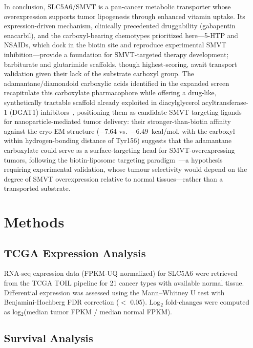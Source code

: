 \documentclass[10pt,letterpaper]{article}
\begin{document}
In conclusion, SLC5A6/SMVT is a pan-cancer metabolic transporter whose overexpression supports tumor lipogenesis through enhanced vitamin uptake. Its expression-driven mechanism, clinically precedented druggability (gabapentin enacarbil), and the carboxyl-bearing chemotypes prioritized here---5-HTP and NSAIDs, which dock in the biotin site and reproduce experimental SMVT inhibition---provide a foundation for SMVT-targeted therapy development; barbiturate and glutarimide scaffolds, though highest-scoring, await transport validation given their lack of the substrate carboxyl group. The adamantane/diamondoid carboxylic acids identified in the expanded screen recapitulate this carboxylate pharmacophore while offering a drug-like, synthetically tractable scaffold already exploited in diacylglycerol acyltransferase-1 (DGAT1) inhibitors~\cite{pagire2015}, positioning them as candidate SMVT-targeting ligands for nanoparticle-mediated tumor delivery: their stronger-than-biotin affinity against the cryo-EM structure ($-7.64$ vs.\ $-6.49$~kcal/mol, with the carboxyl within hydrogen-bonding distance of Tyr156) suggests that the adamantane carboxylate could serve as a surface-targeting head for SMVT-overexpressing tumors, following the biotin-liposome targeting paradigm~\cite{kou2020}---a hypothesis requiring experimental validation, whose tumour selectivity would depend on the degree of SMVT overexpression relative to normal tissues---rather than a transported substrate.


\section*{Methods}

\subsection*{TCGA Expression Analysis}

RNA-seq expression data (FPKM-UQ normalized) for SLC5A6 were retrieved from the TCGA TOIL pipeline for 21 cancer types with available normal tissue. Differential expression was assessed using the Mann--Whitney U test with Benjamini-Hochberg FDR correction ($<$ 0.05). Log$_2$ fold-changes were computed as log$_2$(median tumor FPKM / median normal FPKM).

\subsection*{Survival Analysis}
\end{document}
